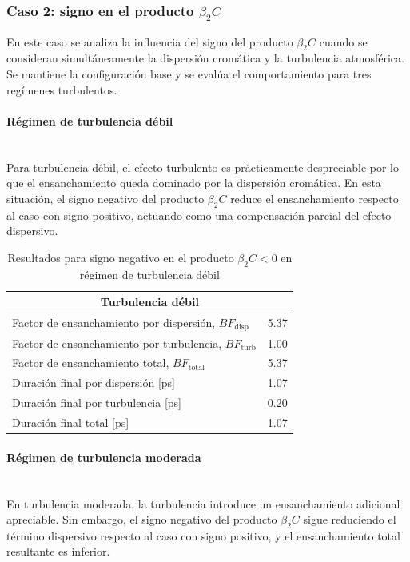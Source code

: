 \subsubsection*{Caso 2: signo en el producto $\beta_{2}C$}
En este caso se analiza la influencia del signo del producto $\beta_{2}C$ cuando se consideran simultáneamente la dispersión cromática y la turbulencia atmosférica. Se mantiene la configuración base y se evalúa el comportamiento para tres regímenes turbulentos.


\paragraph{Régimen de turbulencia débil}\\
Para turbulencia débil, el efecto turbulento es prácticamente despreciable por lo que el ensanchamiento queda dominado por la dispersión cromática. En esta situación, el signo negativo del producto $\beta_{2}C$ reduce el ensanchamiento respecto al caso con signo positivo, actuando como una compensación parcial del efecto dispersivo.

\begin{table}[H]
\centering
\hspace*{-0.6cm}
\renewcommand{\arraystretch}{1.2}
\begin{tabular}{|l|c|}
\hline
\multicolumn{2}{|c|}{\textbf{Turbulencia débil}} \\
\hline
Factor de ensanchamiento por dispersión, $BF_{\mathrm{disp}}$ & 5.37 \\
Factor de ensanchamiento por turbulencia, $BF_{\mathrm{turb}}$ & 1.00 \\
Factor de ensanchamiento total, $BF_{\mathrm{total}}$ & 5.37 \\
\hline
Duración final por dispersión [ps] & 1.07 \\
Duración final por turbulencia [ps] & 0.20 \\
Duración final total [ps] & 1.07 \\
\hline
\end{tabular}
\caption{Resultados para signo negativo en el producto $\beta_2 C < 0$ en régimen de turbulencia débil}
\label{tabla_atm_signo_debil_Cneg}
\end{table}



\paragraph{Régimen de turbulencia moderada}\\
En turbulencia moderada, la turbulencia introduce un ensanchamiento adicional apreciable. Sin embargo, el signo negativo del producto $\beta_2C$ sigue reduciendo el término dispersivo respecto al caso con signo positivo, y el ensanchamiento total resultante es inferior.


